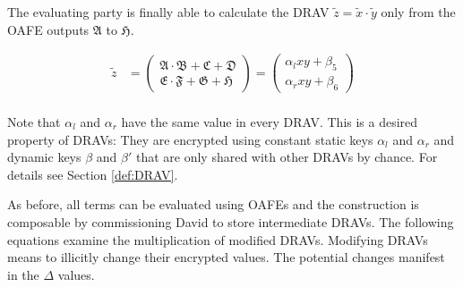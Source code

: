 \noindent{}The evaluating party is finally able to calculate the DRAV
$\widetilde{z} = \widetilde{x} \cdot \widetilde{y}$ only from the OAFE outputs
$\mathfrak{A}$ to $\mathfrak{H}$.

\begin{align*}
  \widetilde{z} & =
  \begin{pmatrix}
    \mathfrak{A} \cdot \mathfrak{B}+\mathfrak{C}+\mathfrak{D}\\
    \mathfrak{E} \cdot \mathfrak{F}+\mathfrak{G}+\mathfrak{H}
  \end{pmatrix}
  =
  \begin{pmatrix}
    \alpha_l xy + \beta_5\\
    \alpha_r xy + \beta_6
  \end{pmatrix}
  \\
\end{align*}

\noindent{}Note that $\alpha_l$ and $\alpha_r$ have the same value in every
DRAV\@. This is a desired property of DRAVs: They are encrypted using constant
static keys $\alpha_l$ and $\alpha_r$ and dynamic keys $\beta$ and $\beta'$ that
are only shared with other DRAVs by chance. For details see Section
\ref{def:DRAV}.

As before, all terms can be evaluated using OAFEs and the construction is
composable by commissioning David to store intermediate DRAVs. The following
equations examine the multiplication of modified DRAVs. Modifying DRAVs means to
illicitly change their encrypted values. The potential changes manifest in the
$\Delta$ values.

